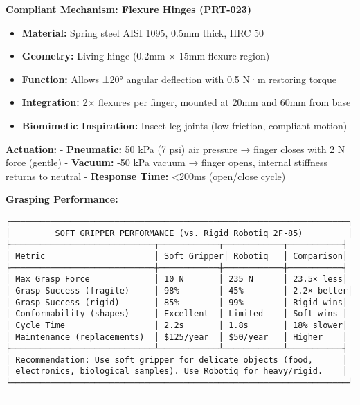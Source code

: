 \documentclass[
]{article}
\providecommand{\tightlist}{%
  \setlength{\itemsep}{0pt}\setlength{\parskip}{0pt}}
\begin{document}
\textbf{Compliant Mechanism: Flexure Hinges (PRT-023)}

\begin{itemize}
\tightlist
\item
  \textbf{Material:} Spring steel AISI 1095, 0.5mm thick, HRC 50
\item
  \textbf{Geometry:} Living hinge (0.2mm × 15mm flexure region)
\item
  \textbf{Function:} Allows ±20° angular deflection with 0.5 N·m
  restoring torque
\item
  \textbf{Integration:} 2× flexures per finger, mounted at 20mm and 60mm
  from base
\item
  \textbf{Biomimetic Inspiration:} Insect leg joints (low-friction,
  compliant motion)
\end{itemize}

\textbf{Actuation:} - \textbf{Pneumatic:} 50 kPa (7 psi) air pressure →
finger closes with 2 N force (gentle) - \textbf{Vacuum:} -50 kPa vacuum
→ finger opens, internal stiffness returns to neutral - \textbf{Response
Time:} \textless200ms (open/close cycle)

\textbf{Grasping Performance:}

\begin{verbatim}
┌────────────────────────────────────────────────────────────────────┐
│         SOFT GRIPPER PERFORMANCE (vs. Rigid Robotiq 2F-85)         │
├─────────────────────────────┬────────────┬────────────┬───────────┤
│ Metric                      │ Soft Gripper│ Robotiq   │ Comparison│
├─────────────────────────────┼────────────┼────────────┼───────────┤
│ Max Grasp Force             │ 10 N       │ 235 N      │ 23.5× less│
│ Grasp Success (fragile)     │ 98%        │ 45%        │ 2.2× better│
│ Grasp Success (rigid)       │ 85%        │ 99%        │ Rigid wins│
│ Conformability (shapes)     │ Excellent  │ Limited    │ Soft wins │
│ Cycle Time                  │ 2.2s       │ 1.8s       │ 18% slower│
│ Maintenance (replacements)  │ $125/year  │ $50/year   │ Higher    │
├─────────────────────────────┴────────────┴────────────┴───────────┤
│ Recommendation: Use soft gripper for delicate objects (food,      │
│ electronics, biological samples). Use Robotiq for heavy/rigid.    │
└────────────────────────────────────────────────────────────────────┘
\end{verbatim}

\begin{center}\rule{0.5\linewidth}{0.5pt}\end{center}
\end{document}
